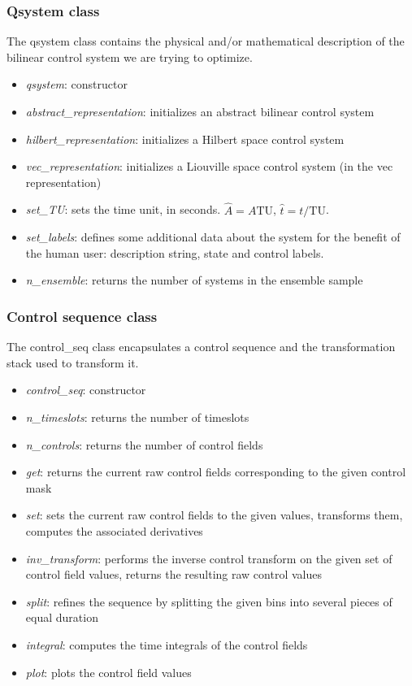 \documentclass[aps, pra, a4paper, longbibliography, superscriptaddress]{revtex4-1}
\begin{document}
\subsubsection{Qsystem class}

The qsystem class contains the physical and/or mathematical
description of the bilinear control system we are trying to optimize.

\begin{itemize}
\item
\emph{qsystem}: constructor
\item
\emph{abstract\_representation}:
initializes an abstract bilinear control system
\item
\emph{hilbert\_representation}:
initializes a Hilbert space control system
\item
\emph{vec\_representation}:
initializes a Liouville space control system (in
the vec representation)
\item
\emph{set\_TU}:
sets the time unit, in seconds.
$\hat{A} = A \text{TU}$, $\hat{t} = t / \text{TU}$.
\item
\emph{set\_labels}:
defines some additional data about the system for the benefit of the
human user: description string, state and control labels.
\item
\emph{n\_ensemble}:
returns the number of systems in the ensemble sample
\end{itemize}

\subsubsection{Control sequence class}

The control\_seq class encapsulates a control sequence and the
transformation stack used to transform it.

\begin{itemize}
\item
\emph{control\_seq}: constructor
\item
\emph{n\_timeslots}:
returns the number of timeslots
\item
\emph{n\_controls}:
returns the number of control fields
\item
\emph{get}:
returns the current raw control fields corresponding to the given control mask
\item
\emph{set}:
sets the current raw control fields to the given values, transforms
them, computes the associated derivatives
\item
\emph{inv\_transform}:
performs the inverse control transform on the given set of control
field values, returns the resulting raw control values
\item
\emph{split}:
refines the sequence by splitting the given bins into several pieces
of equal duration
\item
\emph{integral}:
computes the time integrals of the control fields
\item
\emph{plot}:
plots the control field values
\end{itemize}
\end{document}
